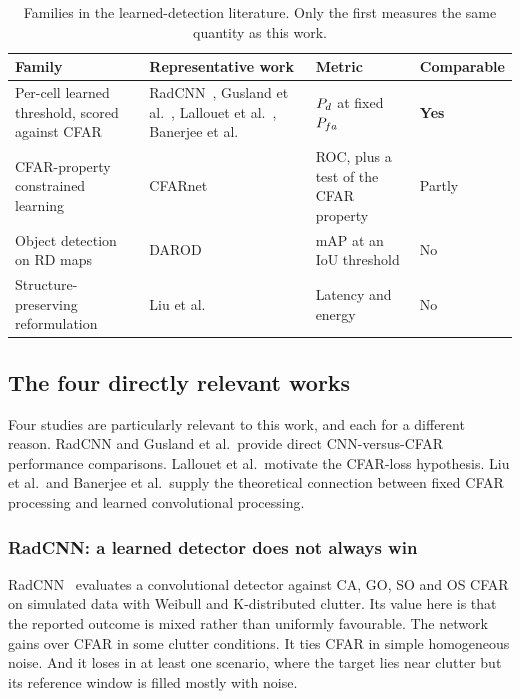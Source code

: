 \begin{table}[H]
\centering
\caption{Families in the learned-detection literature. Only the first measures the same quantity as
this work.}
\label{tab:families}
\begin{tabular}{@{}p{3.4cm}p{4.5cm}p{2.6cm}p{2.5cm}@{}}
\toprule
\textbf{Family} & \textbf{Representative work} & \textbf{Metric} & \textbf{Comparable} \\
\midrule
Per-cell learned threshold, scored against CFAR &
RadCNN~\cite{yavuz2021radcnn}, Gusland et al.~\cite{gusland2020deeptemporal},
Lallouet et al.~\cite{lallouet2023loss}, Banerjee et al.~\cite{banerjee2025rctd} &
$P_{d}$ at fixed $P_{fa}$ &
\textbf{Yes} \\
\addlinespace
CFAR-property constrained learning &
CFARnet~\cite{diskin2023cfarnet} &
ROC, plus a test of the CFAR property &
Partly \\
\addlinespace
Object detection on RD maps &
DAROD~\cite{decourt2022darod} &
mAP at an IoU threshold &
No \\
\addlinespace
Structure-preserving reformulation &
Liu et al.~\cite{liu2024cacfarconv} &
Latency and energy &
No \\
\bottomrule
\end{tabular}
\end{table}

\subsection{The four directly relevant works}

Four studies are particularly relevant to this work, and each for a different reason. RadCNN and
Gusland et al.\ provide direct CNN-versus-CFAR performance comparisons. Lallouet et al.\ motivate
the CFAR-loss hypothesis. Liu et al.\ and Banerjee et al.\ supply the theoretical connection
between fixed CFAR processing and learned convolutional processing.

\subsubsection*{RadCNN: a learned detector does not always win}

RadCNN~\cite{yavuz2021radcnn} evaluates a convolutional detector against CA, GO, SO and OS CFAR on
simulated data with Weibull and K-distributed clutter. Its value here is that the reported outcome
is mixed rather than uniformly favourable. The network gains over CFAR in some clutter conditions.
It ties CFAR in simple homogeneous noise. And it loses in at least one scenario, where the target
lies near clutter but its reference window is filled mostly with noise.

